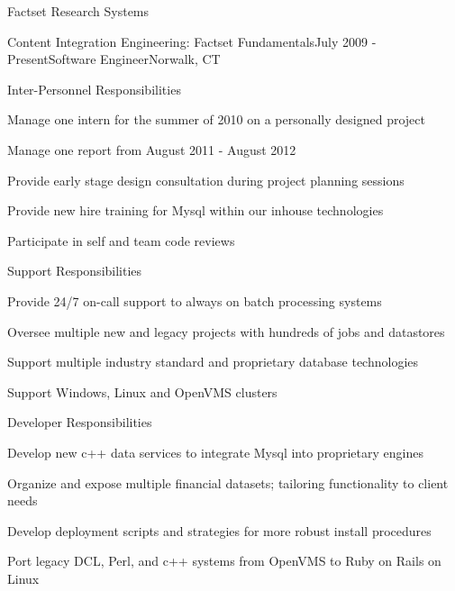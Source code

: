 \documentclass{resume} %
\begin{document}
\begin{rSection}{Factset Research Systems}
\begin{rSubsection}{Content Integration Engineering: Factset Fundamentals}{July 2009 - Present}{Software Engineer}{Norwalk, CT}
\setlength{\itemindent}{1em}
\item Inter-Personnel Responsibilities 
\setlength{\itemindent}{2em}
\item Manage one intern for the summer of 2010 on a personally designed project
\item Manage one report from August 2011 - August 2012
\item Provide early stage design consultation during project planning sessions
\item Provide new hire training for Mysql within our inhouse technologies
\item Participate in self and team code reviews
\setlength{\itemindent}{1em}
\item Support Responsibilities 
\setlength{\itemindent}{2em}
\item	Provide 24/7 on-call support to always on batch processing systems
\item Oversee multiple new and legacy projects with hundreds of jobs and datastores
\item Support multiple industry standard and proprietary database technologies
\item Support Windows, Linux and OpenVMS clusters
\setlength{\itemindent}{1em}
\item Developer Responsibilities 
\setlength{\itemindent}{2em}
\item Develop new c++ data services to integrate Mysql into proprietary engines 
\item Organize and expose multiple financial datasets; tailoring functionality to client needs
\item Develop deployment scripts and strategies for more robust install procedures
\item Port legacy DCL, Perl, and c++ systems from OpenVMS to Ruby on Rails on Linux
\end{rSubsection}

\end{rSection}
\end{document}
